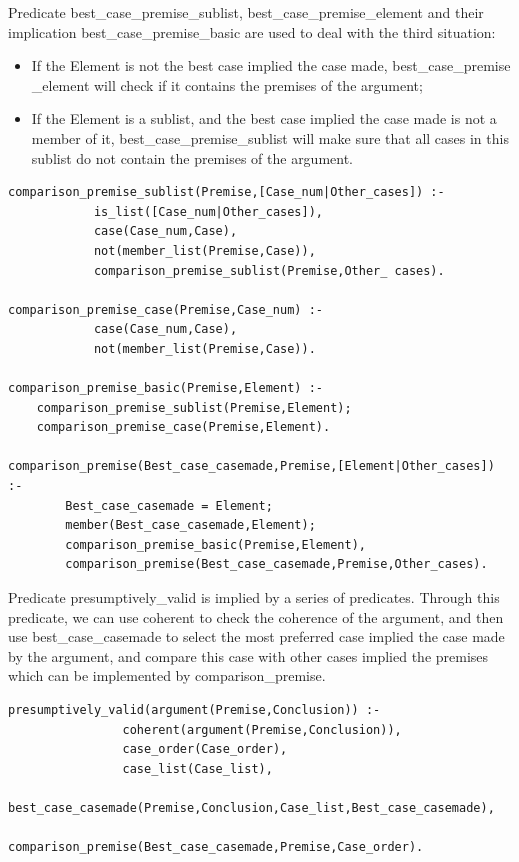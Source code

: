 \documentclass{IOS-Book-Article}
\begin{document}
Predicate {\mf best\_case\_premise\_sublist}, {\mf best\_case\_premise\_element} and their implication {\mf best\_case\_premise\_basic} are used to deal with the third situation:
\begin{itemize}
\item If the {\mf Element} is not the best case implied the case made, {\mf best\_case\_premise \_element} will check if it contains the premises of the argument; 
\item If the {\mf Element} is a sublist, and the best case implied the case made is not a member of it, {\mf best\_case\_premise\_sublist} will make sure that all cases in this sublist do not contain the premises of the argument.
\end{itemize}
\begin{lstlisting}
comparison_premise_sublist(Premise,[Case_num|Other_cases]) :-
			is_list([Case_num|Other_cases]),
			case(Case_num,Case),
			not(member_list(Premise,Case)),
			comparison_premise_sublist(Premise,Other_ cases).

comparison_premise_case(Premise,Case_num) :-
			case(Case_num,Case),
			not(member_list(Premise,Case)).

comparison_premise_basic(Premise,Element) :-
	comparison_premise_sublist(Premise,Element);
	comparison_premise_case(Premise,Element).

comparison_premise(Best_case_casemade,Premise,[Element|Other_cases]) :-
		Best_case_casemade = Element;
		member(Best_case_casemade,Element);
		comparison_premise_basic(Premise,Element),
		comparison_premise(Best_case_casemade,Premise,Other_cases).
\end{lstlisting}

Predicate {\mf presumptively\_valid} is implied by a series of predicates. Through this predicate, we can use {\mf coherent} to check the coherence of the argument, and then use {\mf best\_case\_casemade} to select the most preferred case implied the case made by the argument, and compare this case with other cases implied the premises which can be implemented by {\mf comparison\_premise}.

\begin{lstlisting}		
presumptively_valid(argument(Premise,Conclusion)) :-
				coherent(argument(Premise,Conclusion)),
				case_order(Case_order),
				case_list(Case_list),
				best_case_casemade(Premise,Conclusion,Case_list,Best_case_casemade),
				comparison_premise(Best_case_casemade,Premise,Case_order).
\end{lstlisting}
\end{document}
